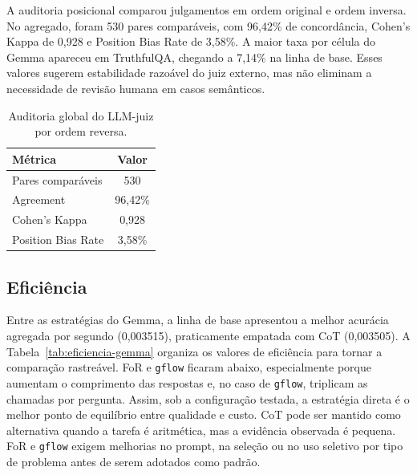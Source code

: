 \documentclass[12pt]{article}
\begin{document}
A auditoria posicional comparou julgamentos em ordem original e ordem inversa. No agregado, foram 530 pares comparáveis, com 96,42\% de concordância, Cohen's Kappa de 0,928 e Position Bias Rate de 3,58\%. A maior taxa por célula do Gemma apareceu em TruthfulQA, chegando a 7,14\% na linha de base. Esses valores sugerem estabilidade razoável do juiz externo, mas não eliminam a necessidade de revisão humana em casos semânticos.

\begin{table}[H]
\centering
\small
\caption{Auditoria global do LLM-juiz por ordem reversa.}
\label{tab:auditoria-juiz-final}
\begin{tabular}{|l|c|}
\hline
\textbf{Métrica} & \textbf{Valor} \\
\hline
Pares comparáveis & 530 \\
Agreement & 96,42\% \\
Cohen's Kappa & 0,928 \\
Position Bias Rate & 3,58\% \\
\hline
\end{tabular}
\end{table}

\FloatBarrier
\subsection{Eficiência}

Entre as estratégias do Gemma, a linha de base apresentou a melhor acurácia agregada por segundo (0,003515), praticamente empatada com CoT (0,003505). A Tabela~\ref{tab:eficiencia-gemma} organiza os valores de eficiência para tornar a comparação rastreável. FoR e \texttt{gflow} ficaram abaixo, especialmente porque aumentam o comprimento das respostas e, no caso de \texttt{gflow}, triplicam as chamadas por pergunta. Assim, sob a configuração testada, a estratégia direta é o melhor ponto de equilíbrio entre qualidade e custo. CoT pode ser mantido como alternativa quando a tarefa é aritmética, mas a evidência observada é pequena. FoR e \texttt{gflow} exigem melhorias no prompt, na seleção ou no uso seletivo por tipo de problema antes de serem adotados como padrão.
\end{document}
